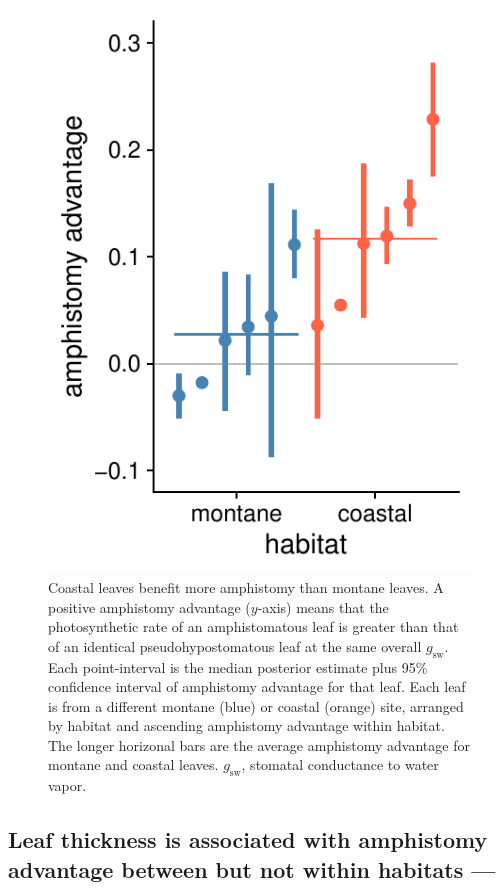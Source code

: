 \documentclass[
  letterpaper,
  DIV=11,
  numbers=noendperiod]{scrartcl}
\begin{document}
\begin{figure}[H]
  \includegraphics{../figures/habitat-aa.pdf}
  \caption{Coastal leaves benefit more amphistomy than montane leaves. A positive amphistomy advantage ($y$-axis) means that the photosynthetic rate of an amphistomatous leaf is greater than that of an identical pseudohypostomatous leaf at the same overall $g_\mathrm{sw}$. Each point-interval is the median posterior estimate plus 95\% confidence interval of amphistomy advantage for that leaf. Each leaf is from a different montane (blue) or coastal (orange) site, arranged by habitat and ascending amphistomy advantage within habitat. The longer horizonal bars are the average amphistomy advantage for montane and coastal leaves. $g_\mathrm{sw}$, stomatal conductance to water vapor.}
  \label{fig:habitat-aa}
\end{figure}

\hypertarget{leaf-thickness-is-associated-with-amphistomy-advantage-between-but-not-within-habitats}{%
\subsection{Leaf thickness is associated with amphistomy advantage
between but not within habitats
---}\label{leaf-thickness-is-associated-with-amphistomy-advantage-between-but-not-within-habitats}}
\end{document}
